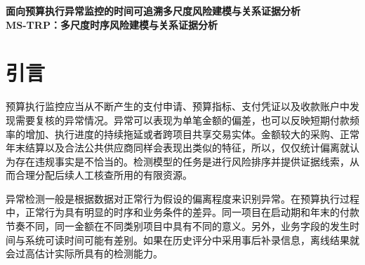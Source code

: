 \documentclass[twocolumn,11pt]{ctexart}
\newcommand{\keywords}[1]{\par\noindent\textbf{关键词：}#1}
\begin{document}
\begin{center}
{\LARGE\bfseries 面向预算执行异常监控的时间可追溯多尺度风险建模与关系证据分析}\\[0.6em]
{\large\bfseries MS-TRP：多尺度时序风险建模与关系证据分析}
\end{center}

\medskip

\begin{abstract}
预算执行的支付数据里，多尺度时序变化、异构实体联系与信息延迟同时存在，字段可读性也参差不齐。靠单一阈值规则，既难覆盖各类异常，也难把复核工作量压到可控范围。本文提出多尺度时序与关系风险传播模型 MS-TRP。它在七日、三十日、当季、当年四个尺度上度量金额、频次与执行进度，参照系由个体历史与同类群体共同建立；再用九类业务实体搭成阶段感知异构图，使已出现风险沿关系扩散。时序分数与关系分数经可靠度门控融合，阈值在验证集冻结，最终落到特征、历史、规则、关系四类审计证据上。数据含88,351条支付记录，2023—2024年训练、2025年验证、2026年测试。测试集上 MS-TRP 的 Payment-AUPRC 为 0.6006，高于 Isolation Forest 的 0.4143 与 Concat-IF 的 0.4008；冻结阈值下精确率 0.9447、召回率 0.1624、FAR/1000 为 1.53，属于低召回、高精度的工作点。把误报预算放宽到 10\% 后，召回升到 0.6169。消融表明多尺度组合是排序性能的主要来源；阶段边权与动态门控的差异落在单次运行的波动量级内，尚不足以支持其独立价值。关系相关组件对整体 AUPRC 增益有限：实体聚集事件在冻结阈值下的召回几乎全部来自账户归属硬规则（17/43），而该规则与共享账户异常的注入方式直接对应；共享收款人子类仅覆盖 1/26。风险排序、阈值告警、事件检出要分开评价。本文结论只对所构造的合成数据成立。换一套独立生成机制后模型仍有效，只是增益收窄，仍有待真实业务数据检验。
\keywords{预算执行；异常检测；多尺度时序；时间可追溯；关系证据分析；误报控制}
\end{abstract}
\section{引言}
预算执行监控应当从不断产生的支付申请、预算指标、支付凭证以及收款账户中发现需要复核的异常情况。异常可以表现为单笔金额的偏差，也可以反映短期付款频率的增加、执行进度的持续拖延或者跨项目共享交易实体。金额较大的采购、正常年末结算以及合法公共供应商同样会表现出类似的特征，所以，仅仅统计偏离就认为存在违规事实是不恰当的。检测模型的任务是进行风险排序并提供证据线索，从而合理分配后续人工核查所用的有限资源。

异常检测一般是根据数据对正常行为假设的偏离程度来识别异常\cite{ref1}。在预算执行过程中，正常行为具有明显的时序和业务条件的差异。同一项目在启动期和年末的付款节奏不同，同一金额在不同类别项目中具有不同的意义。另外，业务字段的发生时间与系统可读时间可能有差别。如果在历史评分中采用事后补录信息，离线结果就会过高估计实际所具有的检测能力。
\end{document}
